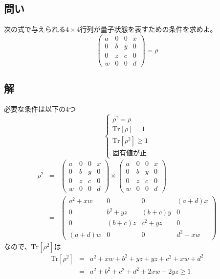 \documentclass[10pt]{ujarticle}
\begin{document}
\section{}
\subsection{問い}
次の式で与えられる$4 \times 4$行列が量子状態を表すための条件を求めよ。
\[
\left(
\begin{array}{cccc}
  a & 0 & 0 & x \\
  0 & b & y & 0 \\
  0 & z & c & 0 \\
  w & 0 & 0 & d
\end{array}
\right) = \rho
\]

\subsection{解}
必要な条件は以下の4つ
\[
\begin{cases}
  \rho^\dagger = \rho\\
  \mathrm{Tr}\left[\rho\right] = 1\\
  \mathrm{Tr}\left[\rho^2\right] \geq 1\\
  固有値が正
\end{cases}
\]
\begin{eqnarray*}
  \rho^2 &=& \left(
  \begin{array}{cccc}
    a & 0 & 0 & x \\
    0 & b & y & 0 \\
    0 & z & c & 0 \\
    w & 0 & 0 & d
  \end{array}
  \right) \times \left(
  \begin{array}{cccc}
    a & 0 & 0 & x \\
    0 & b & y & 0 \\
    0 & z & c & 0 \\
    w & 0 & 0 & d
  \end{array}
  \right)\\
  &=& \left(
  \begin{array}{cccc}
    a^2+xw & 0 & 0 & (a+d)x \\
    0 & b^2+yz & (b+c)y & 0 \\
    0 & (b+c)z & c^2+yz & 0 \\
    (a+d)w & 0 & 0 & d^2+xw
  \end{array}
  \right)
\end{eqnarray*}
なので、$\mathrm{Tr}[\rho^2]$は
\begin{eqnarray*}
  \mathrm{Tr}[\rho^2] &=& a^2 + xw + b^2 + yz + yz + c^2 + xw + d^2\\
  &=& a^2 + b^2 + c^2 + d^2 + 2xw + 2yz \geq 1
\end{eqnarray*}
\end{document}

